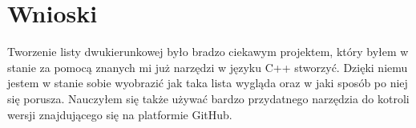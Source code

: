 	\newpage
\section{Wnioski}	%

\hspace{0.60cm}Tworzenie listy dwukierunkowej było bradzo ciekawym projektem, który byłem w stanie za pomocą znanych mi już narzędzi w języku C++ stworzyć. Dzięki niemu jestem w stanie sobie wyobrazić jak taka lista wygląda oraz w jaki sposób po niej się porusza. Nauczyłem się także używać bardzo przydatnego narzędzia do kotroli wersji znajdującego się na platformie GitHub\footnotemark.

